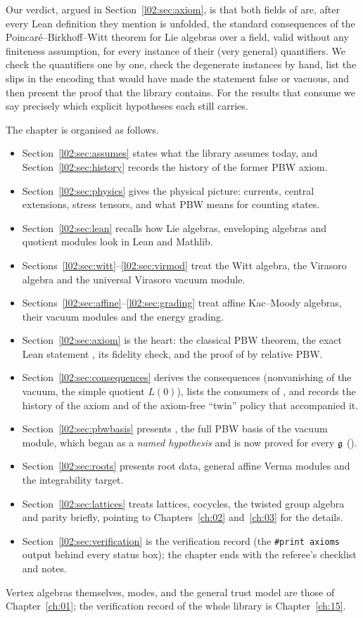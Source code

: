 Our verdict, argued in Section~\ref{l02:sec:axiom}, is that both fields of  are,
after every Lean definition they mention is unfolded, the standard consequences of the
Poincar\'e--Birkhoff--Witt theorem for Lie algebras over a field, valid without any finiteness
assumption, for every instance of their (very general) quantifiers. We check the quantifiers one by
one, check the degenerate instances by hand, list the slips in the encoding that would have made the
statement false or vacuous, and then present the proof that the library contains. For the results
that consume  we say precisely which explicit hypotheses each still carries.

The chapter is organised as follows.
\begin{itemize}
\item Section~\ref{l02:sec:assumes} states what the library assumes today, and
  Section~\ref{l02:sec:history} records the history of the former PBW axiom.
\item Section~\ref{l02:sec:physics} gives the physical picture: currents, central extensions,
  stress tensors, and what PBW means for counting states.
\item Section~\ref{l02:sec:lean} recalls how Lie algebras, enveloping algebras and quotient
  modules look in Lean and Mathlib.
\item Sections~\ref{l02:sec:witt}--\ref{l02:sec:virmod} treat the Witt algebra, the Virasoro
  algebra and the universal Virasoro vacuum module.
\item Sections~\ref{l02:sec:affine}--\ref{l02:sec:grading} treat affine Kac--Moody algebras, their
  vacuum modules and the energy grading.
\item Section~\ref{l02:sec:axiom} is the heart: the classical PBW theorem, the exact Lean statement
  , its fidelity check, and the proof of  by relative PBW.
\item Section~\ref{l02:sec:consequences} derives the consequences (nonvanishing of the vacuum, the
  simple quotient $L(0)$), lists the consumers of , and records the history of the
  axiom and of the axiom-free ``twin'' policy that accompanied it.
\item Section~\ref{l02:sec:pbwbasis} presents , the full PBW basis of the vacuum
  module, which began as a \emph{named hypothesis} and is now proved for every $\mathfrak{g}$
  ().
\item Section~\ref{l02:sec:roots} presents root data, general affine Verma modules and the
  integrability target.
\item Section~\ref{l02:sec:lattices} treats lattices, cocycles, the twisted group algebra and parity
  briefly, pointing to Chapters~\ref{ch:02} and~\ref{ch:03} for the details.
\item Section~\ref{l02:sec:verification} is the verification record (the \texttt{\#print axioms} output
  behind every status box); the chapter ends with the referee's checklist and notes.
\end{itemize}
Vertex algebras themselves, modes, and the general trust model are those of
Chapter~\ref{ch:01}; the verification record of the whole library is Chapter~\ref{ch:15}.


